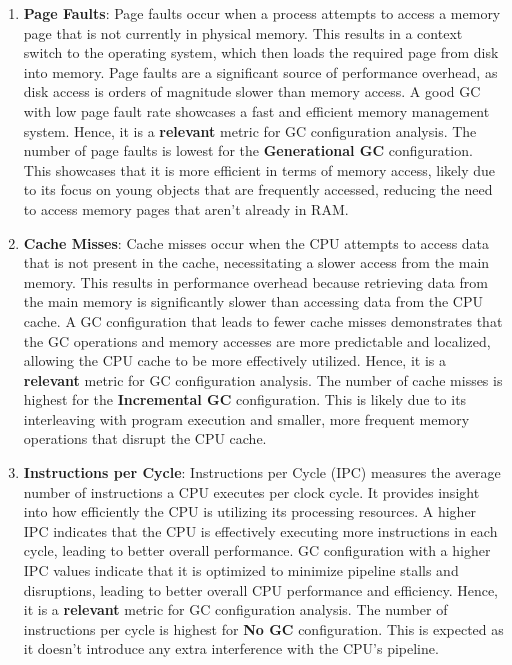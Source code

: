 \documentclass[11pt,paper=a4,answers]{exam}
\begin{document}
\begin{enumerate}
    \item \textbf{Page Faults}: Page faults occur when a process attempts to access a memory page that is not currently in physical memory. This results in a context switch to the operating system, which then loads the required page from disk into memory. Page faults are a significant source of performance overhead, as disk access is orders of magnitude slower than memory access. A good GC with low page fault rate showcases a fast and efficient memory management system. Hence, it is a \textbf{relevant} metric for GC configuration analysis.
    \vspace{1mm}
    \newline
    The number of page faults is lowest for the \textbf{Generational GC} configuration. This showcases that it is more efficient in terms of memory access, likely due to its focus on young objects that are frequently accessed, reducing the need to access memory pages that aren't already in RAM.
    \item \textbf{Cache Misses}: Cache misses occur when the CPU attempts to access data that is not present in the cache, necessitating a slower access from the main memory. This results in performance overhead because retrieving data from the main memory is significantly slower than accessing data from the CPU cache. A GC configuration that leads to fewer cache misses demonstrates that the GC operations and memory accesses are more predictable and localized, allowing the CPU cache to be more effectively utilized. Hence, it is a \textbf{relevant} metric for GC configuration analysis.
    \vspace{1mm}
    \newline
    The number of cache misses is highest for the \textbf{Incremental GC} configuration. This is likely due to its interleaving with program execution and smaller, more frequent memory operations that disrupt the CPU cache.
    \item \textbf{Instructions per Cycle}: Instructions per Cycle (IPC) measures the average number of instructions a CPU executes per clock cycle. It provides insight into how efficiently the CPU is utilizing its processing resources. A higher IPC indicates that the CPU is effectively executing more instructions in each cycle, leading to better overall performance. GC configuration with a higher IPC values indicate that it is optimized to minimize pipeline stalls and disruptions, leading to better overall CPU performance and efficiency. Hence, it is a \textbf{relevant} metric for GC configuration analysis.
    \vspace{1mm}
    \newline
    The number of instructions per cycle is highest for \textbf{No GC} configuration. This is expected as it doesn't introduce any extra interference with the CPU's pipeline.
\end{enumerate}
\end{document}
